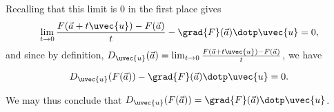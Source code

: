\documentclass{ximera}
\begin{document}
Recalling that this limit is $0$ in the first place gives
\[
\lim_{t \to 0} \frac{F( \vec{a}+t\uvec{u})-F(\vec{a})}{t} - \grad{F}(\vec{a}) \dotp \uvec{u} = 0,
\]
and since by definition, $D_{\uvec{u}}(\vec{a}) = \lim_{t \to 0} \frac{F( \vec{a}+t\uvec{u})-F(\vec{a})}{t}$, we have

\[
D_{\uvec{u}} (F(\vec{a})) - \grad{F}(\vec{a}) \dotp \uvec{u} = 0.
\]

We may thus conclude that $D_{\uvec{u}} (F(\vec{a})) =
\grad{F}(\vec{a}) \dotp \uvec{u}$.
\end{document}
